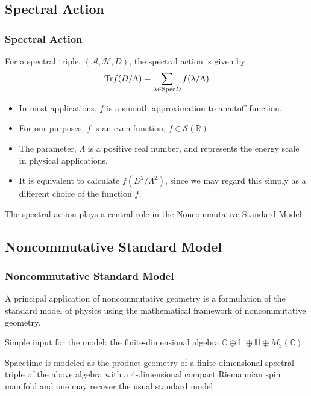 \documentclass{beamer}
\def\C{{\mathbb C}}
\renewcommand{\H}{{\mathbb H}}
\def\R{{\mathbb R}}
\def\cA{{\mathcal A}}
\def\cH{{\mathcal H}}
\def\Spec{{\rm Spec}}
\def\Tr{{\rm Tr}}
\begin{document}
\subsection{Spectral Action}

\begin{frame}
  \frametitle{Spectral Action}

  \begin{block}{}
    For a spectral triple, $(\cA, \cH, D)$, the spectral action is given by
    \[
    \Tr f(D / \Lambda) = \sum_{\lambda \in \Spec D} f(\lambda/\Lambda)
    \]
  \end{block}

  \pause

  \begin{itemize}
    \item In most applications, $f$ is a smooth approximation to a cutoff function.
    \item For our purposes, $f$ is an even function, $f \in \mathcal{S} (\R)$
    \item The parameter, $\Lambda$ is a positive real number, and represents the energy scale in physical applications.
    \item It is equivalent to calculate $f(D^2/ \Lambda ^2)$, since we may regard this simply as a different choice of the function $f$.
  \end{itemize}

  \pause

  \begin{block}{}
    The spectral action plays a central role in the Noncommutative Standard Model
  \end{block}

\end{frame}


\subsection{Noncommutative Standard Model}

\begin{frame}
  \frametitle{Noncommutative Standard Model}

  \begin{block}{}
    A principal application of noncommutative geometry is a formulation of the standard model of physics using the mathematical framework of noncommutative geometry.
  \end{block}

  \pause

  \begin{block}{}
    Simple input for the model: the finite-dimensional algebra $\C \oplus \H \oplus \H \oplus M_3(\C)$
  \end{block}

  \pause

  \begin{block}{}
    Spacetime is modeled as the product geometry of a finite-dimensional spectral triple of the above algebra with a 4-dimensional compact Riemannian spin manifold and one may recover the usual standard model
  \end{block}

\end{frame}
\end{document}
